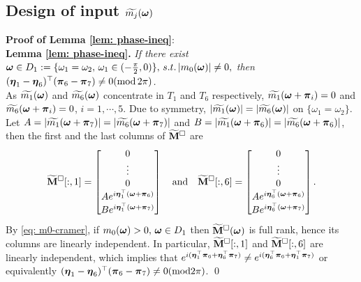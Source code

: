 \subsection{Design of input $\widetilde{m_{j}}(\boldsymbol{\omega})$}\label{app: input design}
{\bf Proof of Lemma \ref{lem: phase-ineq}}:\\[.2em]
{\bf Lemma \ref{lem: phase-ineq}.} 
{\it If there exist $\boldsymbol{\omega}\in D_1:=\{\omega_1=\omega_2,\,\omega_1\in(-\frac{\pi}{2},0)\},\,s.t. \,|m_0(\boldsymbol{\omega})|\neq 0,$ then $(\boldsymbol{\eta}_1-\boldsymbol{\eta}_6)^\top (\boldsymbol{\pi}_6-\boldsymbol{\pi}_7)\neq 0(\text{mod}\,2\pi)$. 
}\\ [1em]
As $\widetilde{m_{1}}(\boldsymbol{\omega})$ and $\widetilde{m_{6}}(\boldsymbol{\omega})$ concentrate in $T_1$ and $T_6$ respectively, $\widetilde{m_1}(\boldsymbol{\omega} + \boldsymbol{\pi}_i) = 0$ and  $\widetilde{m_6}(\boldsymbol{\omega} + \boldsymbol{\pi}_i) = 0$, $i = 1,\cdots, 5$. Due to symmetry, $|\widetilde{m_1}(\boldsymbol{\omega})| = |\widetilde{m_6}(\boldsymbol{\omega})|$ on $\{\omega_1=\omega_2\}$. Let $A = |\widetilde{m_1}(\boldsymbol{\omega}+\boldsymbol{\pi}_7)| = |\widetilde{m_6}(\boldsymbol{\omega}+\boldsymbol{\pi}_7)|$ and $B=|\widetilde{m_1}(\boldsymbol{\omega}+\boldsymbol{\pi}_6)| = |\widetilde{m_6}(\boldsymbol{\omega}+\boldsymbol{\pi}_6)|$, then the first and the last columns of $\widetilde{\mathbf{M}}^{\Box}$ are
  \begin{align*}
  \widetilde{\mathbf{M}}^{\Box}[:,1] = 
 \begin{bmatrix}
 0\\
 \vdots\\
 0\\
 Ae^{i\boldsymbol{\eta}_1^\top(\boldsymbol{\omega}+\boldsymbol{\pi}_6)}\\
 Be^{i\boldsymbol{\eta}_1^\top(\boldsymbol{\omega}+\boldsymbol{\pi}_7)}
 \end{bmatrix}
 \quad\text{and}\quad
  \widetilde{\mathbf{M}}^{\Box}[:,6] = 
 \begin{bmatrix}
 0\\
 \vdots\\
 0\\
 Ae^{i\boldsymbol{\eta}_6^\top(\boldsymbol{\omega}+\boldsymbol{\pi}_6)}\\
 Be^{i\boldsymbol{\eta}_6^\top(\boldsymbol{\omega}+\boldsymbol{\pi}_7)}
 \end{bmatrix} .
\end{align*}   
By \eqref{eq: m0-cramer}, if $m_0(\boldsymbol{\omega})>0, \,\boldsymbol{\omega}\in D_1$ then $\widetilde{\mathbf{M}}^{\Box}(\boldsymbol{\omega})$ is full rank, hence its columns are linearly independent.
In particular, $\widetilde{\mathbf{M}}^{\Box}[:,1]$ and $\widetilde{\mathbf{M}}^{\Box}[:,6]$ are linearly independent, which implies that $e^{i(\boldsymbol{\eta}_1^\top\boldsymbol{\pi}_6 + \boldsymbol{\eta}_6^\top\boldsymbol{\pi}_7)}\neq e^{i(\boldsymbol{\eta}_6^\top\boldsymbol{\pi}_6 + \boldsymbol{\eta}_1^\top\boldsymbol{\pi}_7)}$%
 or equivalently $(\boldsymbol{\eta}_1-\boldsymbol{\eta}_6)^\top(\boldsymbol{\pi}_6-\boldsymbol{\pi}_7)\neq 0(\text{mod}2\pi)$. \qed\\


